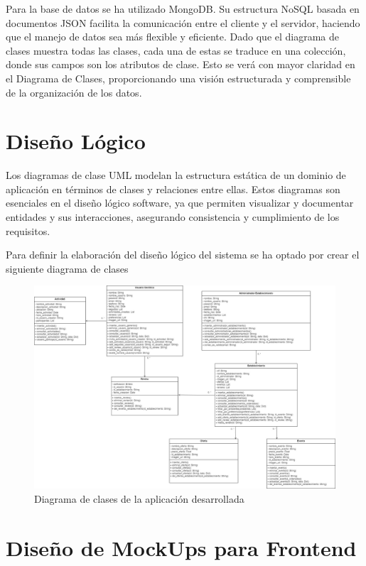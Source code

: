 Para la base de datos se ha utilizado MongoDB. Su estructura NoSQL basada en documentos JSON facilita la comunicación entre el cliente y el servidor, haciendo que el manejo de datos sea más flexible y eficiente. Dado que el diagrama de clases muestra todas las clases, cada una de estas se traduce en una colección, donde sus campos son los atributos de clase. Esto se verá con mayor claridad en el Diagrama de Clases, proporcionando una visión estructurada y comprensible de la organización de los datos.

\section{Diseño Lógico}

Los diagramas de clase UML modelan la estructura estática de un dominio de aplicación en términos de clases y relaciones entre ellas. Estos diagramas son esenciales en el diseño lógico software, ya que permiten visualizar y documentar entidades y sus interacciones, asegurando consistencia y cumplimiento de los requisitos. \cite{berardi}

Para definir la elaboración del diseño lógico del sistema se ha optado por crear el siguiente diagrama de clases

\begin{figure}[H]
    \centering
    \includegraphics[width=\textwidth]{imagenes/DiagramaHangOut.jpg}
    \caption{Diagrama de clases de la aplicación desarrollada}
    \label{fig:DiagramaHangOut}
\end{figure}


\section{Diseño de MockUps para Frontend}


